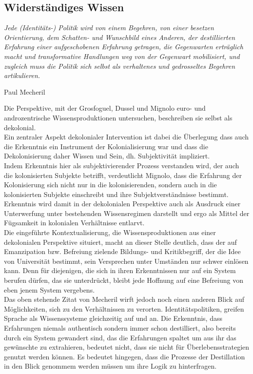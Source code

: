 \subsection{Widerständiges Wissen}
\epigraph{\textit{ 
Jede (Identitäts-) Politik wird von einem Begehren, von einer besetzen
Orientierung, dem Schatten- und Wunschbild eines Anderen, der destillierten
Erfahrung einer aufgeschobenen Erfahrung getragen, die Gegenwarten erträglich
macht und transformative Handlungen weg von der Gegenwart mobilisiert, und
zugleich muss die Politik sich selbst als verhaltenes und gedrosseltes Begehren
artikulieren.}}{Paul Mecheril\footnotemark}  

Die Perspektive, mit der Grosfoguel, Dussel und Mignolo euro- und
androzentrische Wissensproduktionen untersuchen, beschreiben sie selbst als
dekolonial.\\
Ein zentraler Aspekt dekolonialer Intervention ist dabei die
Überlegung \glqq dass auch die Erkenntnis ein Instrument der Kolonialisierung war
und dass die Dekolonisierung daher Wissen und Sein, dh. Subjektivität
impliziert.\grqq\footnotemark{}\\
Indem Erkenntnis hier als subjektivierender Prozess verstanden wird, der auch
die kolonisierten Subjekte betrifft, verdeutlicht Mignolo, dass die Erfahrung
der Kolonisierung sich nicht nur in die kolonisierenden, sondern auch in die
kolonisierten Subjekte einschreibt und ihre Subjektverständnisse bestimmt.
Erkenntnis wird damit in der dekolonialen Perspektive auch als Ausdruck einer
Unterwerfung unter bestehenden Wissensregimen darstellt und ergo als Mittel
der Fügsamkeit in kolonialen Verhältnisse entlarvt.\\

\noindent Die eingeführte Kontextualisierung, die Wissensproduktionen aus einer
dekolonialen Perspektive situiert, macht an dieser Stelle deutlich, dass der
auf Emanzipation bzw. Befreiung zielende Bildungs- und Kritikbegriff, der die
Idee von Universität bestimmt, sein Versprechen unter Umständen nur schwer
einlösen kann. Denn für diejenigen, die sich in ihren Erkenntnissen nur auf
ein System berufen dürfen, das sie unterdrückt, bleibt jede Hoffnung auf eine
Befreiung von eben jenem System vergebens. \\

\noindent Das oben stehende Zitat von Mecheril
wirft jedoch noch einen anderen Blick auf Möglichkeiten, sich zu den
Verhältnissen zu verorten. Identitätspolitiken, greifen Sprache als
Wissenssysteme gleichzeitig auf und an. Die Erkenntnis, dass Erfahrungen niemals
authentisch sondern immer schon destilliert, also bereits durch ein System
gewandert sind, das die Erfahrungen spaltet um aus ihr das gewünschte zu
extrahieren, bedeutet nicht, dass sie nicht für Überlebensstrategien genutzt
werden können. Es bedeutet hingegen, dass die Prozesse der Destillation in den Blick
genommem werden müssen um ihre Logik zu hinterfragen.\\

